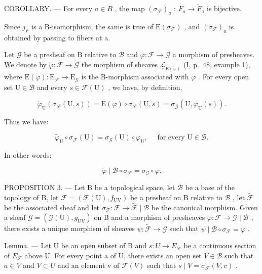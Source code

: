 COROLLARY. --- For every \(a \in B\) , the map \((\sigma_{\mathcal{F}})_{a}\) : \(F_{a} \to \widetilde{F}_{a}\) is bijective.

Since \(j_{F}\) is a B-isomorphism, the same is true of \(\mathrm{E}(\sigma_{\mathcal{F}})\) , and \((\sigma_{\mathcal{F}})_{a}\) is obtained by passing to fibers at a.

Let \(\mathcal{G}\) be a presheaf on B relative to \(\mathcal{B}\) and \(\varphi\colon\mathcal{F}\to\mathcal{G}\) a morphism of presheaves. We denote by \(\widetilde{\varphi}\colon\widetilde{\mathcal{F}}\to\widetilde{\mathcal{G}}\) the morphism of sheaves \(\underline{\mathcal{L}}_{\mathrm{E}(\varphi)}\) (I, p.~48, example 1), where \(\mathrm{E}(\varphi)\colon\mathrm{E}_{\mathcal{F}}\to\mathrm{E}_{\mathcal{G}}\) is the B-morphism associated with \(\varphi\) . For every open set \(\mathrm{U}\in\mathcal{B}\) and every \(s\in\mathcal{F}(\mathrm{U})\) , we have, by definition,

\[
\widetilde {\varphi} _ {\mathrm{U}} (\sigma_ {\mathcal {F}} (\mathrm{U}, s)) = \mathrm{E} (\varphi) \circ \sigma_ {\mathcal {F}} (\mathrm{U}, s) = \sigma_ {\mathcal {G}} (\mathrm{U}, \varphi_ {\mathrm{U}} (s)).
\]

Thus we have:

\[
\widetilde {\varphi} _ {\mathrm{U}} \circ \sigma_ {\mathcal {F}} (\mathrm{U}) = \sigma_ {\mathcal {G}} (\mathrm{U}) \circ \varphi_ {\mathrm{U}}, \quad \text {   for   every   } \mathrm{U} \in \mathcal {B}.\tag{1}
\]

In other words:

\[
\widetilde {\varphi} \mid \mathcal {B} \circ \sigma_ {\mathcal {F}} = \sigma_ {\mathcal {G}} \circ \varphi .\tag{2}
\]

PROPOSITION 3. --- Let B be a topological space, let \(\mathcal{B}\) be a base of the topology of B, let \(\mathcal{F} = (\mathcal{F}(\mathrm{U}), f_{\mathrm{UV}})\) be a presheaf on B relative to \(\mathcal{B}\) , let \(\widetilde{\mathcal{F}}\) be the associated sheaf and let \(\sigma_{\mathcal{F}}: \mathcal{F} \to \widetilde{\mathcal{F}} \mid \mathcal{B}\) be the canonical morphism. Given a sheaf \(\mathcal{G} = (\mathcal{G}(\mathrm{U}), g_{\mathrm{UV}})\) on B and a morphism of presheaves \(\varphi: \mathcal{F} \to \mathcal{G} \mid \mathcal{B}\) , there exists a unique morphism of sheaves \(\psi: \widetilde{\mathcal{F}} \to \mathcal{G}\) such that \(\psi \mid \mathcal{B} \circ \sigma_{\mathcal{F}} = \varphi\) .

Lemma. --- Let U be an open subset of B and \(s\colon U \to E_{\mathcal{F}}\) be a continuous section of \(E_{\mathcal{F}}\) above U. For every point a of U, there exists an open set \(V \in \mathcal{B}\) such that \(a \in V\) and \(V \subset U\) and an element v of \(\mathcal{F}(V)\) such that \(s \mid V = \sigma_{\mathcal{F}}(V, v)\) .

